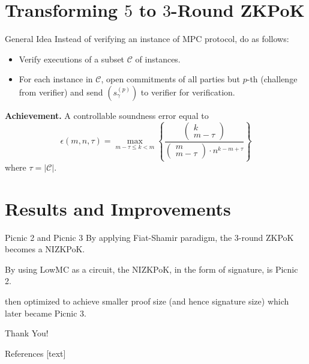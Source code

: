 \documentclass{beamer}
\begin{document}
	\section{Transforming $5$ to $3$-Round ZKPoK}
	\begin{frame}{General Idea}
		Instead of verifying an instance of MPC protocol, do as follows:
		\begin{itemize}
			\item Verify executions of a subset $\mathcal{C}$ of instances.
			\item For each instance in $\mathcal{C}$, open commitments of all parties but $p$-th (challenge from verifier) and send $(s_\gamma^{(p)})$ to verifier for verification.
		\end{itemize}
		
		\textbf{Achievement.} A controllable soundness error equal to 
		\begin{equation*}
			\epsilon(m, n, \tau) = \max_{m - \tau \leq k < m}\left\{\frac{\begin{pmatrix}
					k\\m-\tau
			\end{pmatrix}}{\begin{pmatrix}
			m\\m-\tau
		\end{pmatrix}\cdot n^{k - m + \tau}}\right\}
		\end{equation*}
		where $\tau = \vert \mathcal{C}\vert$.
	\end{frame}

	\section{Results and Improvements}
	\begin{frame}{Picnic 2 and Picnic 3}
		By applying Fiat-Shamir paradigm, the $3$-round ZKPoK becomes a NIZKPoK.
		
		By using LowMC as a circuit, the NIZKPoK, in the form of signature, is Picnic 2.
		
		\cite{KalesZ20} then optimized to achieve smaller proof size (and hence signature size) which later became Picnic 3.
	\end{frame}
	
	\begin{frame}{}
		\begin{center}
			{\fontsize{20}{20}\selectfont Thank You!}
		\end{center}
	\end{frame}

	\begin{frame}[allowframebreaks]{References}
		
		
		
	\end{frame}
	
\end{document}
